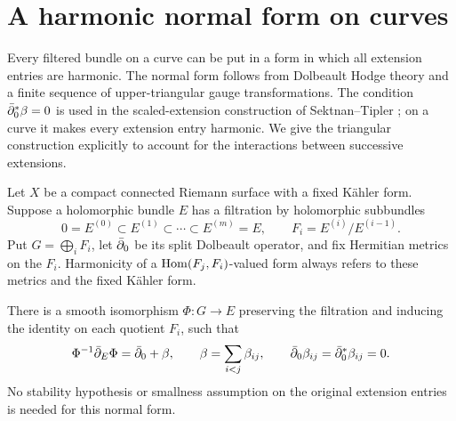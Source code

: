 \section{A harmonic normal form on curves}\label{sec:normal-form}

Every filtered bundle on a curve can be put in a form in which all
extension entries are harmonic. The normal form follows from Dolbeault
Hodge theory and a finite sequence of upper-triangular gauge
transformations. The condition $\bar\partial_0^*\beta=0$ is used in the
scaled-extension construction of Sektnan--Tipler
\cite[Section~5.1, equation~(28)]{SektnanTipler2024}; on a curve it makes
every extension entry harmonic. We give the triangular construction
explicitly to account for the interactions between successive extensions.


Let $X$ be a compact connected Riemann surface with a fixed K\"ahler
form. Suppose a holomorphic bundle $E$ has a filtration by holomorphic
subbundles
\begin{equation}\label{eq:curve-filtration}
 0=E^{(0)}\subset E^{(1)}\subset\cdots\subset E^{(m)}=E,
 \qquad F_i=E^{(i)}/E^{(i-1)}.
\end{equation}
Put $G=\bigoplus_i F_i$, let $\bar\partial_0$ be its split Dolbeault operator,
and fix Hermitian metrics on the $F_i$. Harmonicity of a
$\operatorname{Hom}(F_j,F_i)$-valued form always refers to these metrics and the
fixed K\"ahler form.

\begin{lemma}\label{lem:normal-form}
There is a smooth isomorphism $\Phi:G\to E$ preserving the
filtration and inducing the identity on each quotient $F_i$, such that
\begin{equation}\label{eq:harmonic-normal-form}
 \Phi^{-1}\bar\partial_E\Phi=\bar\partial_0+\beta,\qquad
 \beta=\sum_{i<j}\beta_{ij},\qquad
 \bar\partial_0\beta_{ij}=\bar\partial_0^*\beta_{ij}=0.
\end{equation}
No stability hypothesis or smallness assumption on the original
extension entries is needed for this normal form.
\end{lemma}

